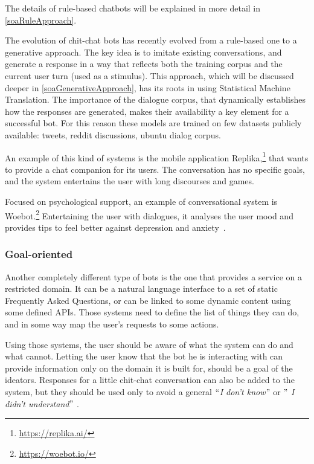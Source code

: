 The details of rule-based chatbots will be explained in more detail in \ref{soaRuleApproach}.

The evolution of chit-chat bots has recently evolved from a rule-based one to a generative approach. The key idea is to imitate existing conversations, and generate a response in a way that reflects both the training corpus and the current user turn (used as a stimulus). This approach, which will be discussed deeper in \ref{soaGenerativeApproach}, has its roots in using Statistical Machine Translation. The importance of the dialogue corpus, that dynamically establishes how the responses are generated, makes their availability a key element for a successful bot. For this reason these models are trained on few datasets publicly available: tweets, reddit discussions, ubuntu dialog corpus.

An example of this kind of systems is the mobile application Replika,\footnote{\url{https://replika.ai/}} that wants to provide a chat companion for its users. The conversation has no specific goals, and the system entertains the user with long discourses and games.

Focused on psychological support, an example of conversational system is Woebot.\footnote{\url{https://woebot.io/}} Entertaining the user with dialogues, it analyses the user mood and provides tips to feel better against depression and anxiety~\cite{fitzpatrick2017delivering}.

\subsubsection{Goal-oriented}
Another completely different type of bots is the one that provides a service on a restricted domain. It can be a natural language interface to a set of static Frequently Asked Questions, or can be linked to some dynamic content using some defined APIs. Those systems need to define the list of things they can do, and in some way map the user's requests to some actions.

Using those systems, the user should be aware of what the system can do and what cannot. Letting the user know that the bot he is interacting with can provide information only on the domain it is built for, should be a goal of the ideators. Responses for a little chit-chat conversation can also be added to the system, but they should be used only to avoid a general $``$\textit{I don't know}$"$  or $"$ \textit{I didn't understand}$"$ .

